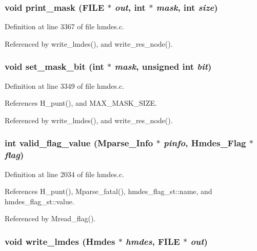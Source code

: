\subsubsection{\setlength{\rightskip}{0pt plus 5cm}void print\_\-mask (FILE $\ast$ {\em out}, int $\ast$ {\em mask}, int {\em size})}\label{hmdes_8c_bdc578c791b46b07c9c23509b76545ca}




Definition at line 3367 of file hmdes.c.

Referenced by write\_\-lmdes(), and write\_\-res\_\-node().
\subsubsection{\setlength{\rightskip}{0pt plus 5cm}void set\_\-mask\_\-bit (int $\ast$ {\em mask}, unsigned int {\em bit})}\label{hmdes_8c_93982c65f2c3e166d73a84df641bbc40}




Definition at line 3349 of file hmdes.c.

References H\_\-punt(), and MAX\_\-MASK\_\-SIZE.

Referenced by write\_\-lmdes(), and write\_\-res\_\-node().
\subsubsection{\setlength{\rightskip}{0pt plus 5cm}int valid\_\-flag\_\-value (\bf{Mparse\_\-Info} $\ast$ {\em pinfo}, \bf{Hmdes\_\-Flag} $\ast$ {\em flag})}\label{hmdes_8c_a3a7e52722cb239b9007ac64a3dbd605}




Definition at line 2034 of file hmdes.c.

References H\_\-punt(), Mparse\_\-fatal(), hmdes\_\-flag\_\-st::name, and hmdes\_\-flag\_\-st::value.

Referenced by Mread\_\-flag().
\subsubsection{\setlength{\rightskip}{0pt plus 5cm}void write\_\-lmdes (\bf{Hmdes} $\ast$ {\em hmdes}, FILE $\ast$ {\em out})}\label{hmdes_8c_c02228103228aa8bc10596f96ca952bb}




